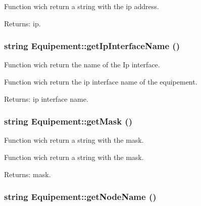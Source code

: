Function wich return a string with the ip address.

\begin{Desc}
\item[Returns:]ip. \end{Desc}
\hypertarget{class_equipement_c1bc0f20388d78e67e4d808548ec0e7e}{
\subsubsection[{getIpInterfaceName}]{\setlength{\rightskip}{0pt plus 5cm}string Equipement::getIpInterfaceName ()}}
\label{class_equipement_c1bc0f20388d78e67e4d808548ec0e7e}


Function wich return the name of the Ip interface. 

Function wich return the ip interface name of the equipement.

\begin{Desc}
\item[Returns:]ip interface name. \end{Desc}
\hypertarget{class_equipement_02fa3326bab78a49535be1cbd2bd8078}{
\subsubsection[{getMask}]{\setlength{\rightskip}{0pt plus 5cm}string Equipement::getMask ()}}
\label{class_equipement_02fa3326bab78a49535be1cbd2bd8078}


Function wich return a string with the mask. 

Function wich return a string with the mask.

\begin{Desc}
\item[Returns:]mask. \end{Desc}
\hypertarget{class_equipement_b8f87002fae848cffc5761f627a5af45}{
\subsubsection[{getNodeName}]{\setlength{\rightskip}{0pt plus 5cm}string Equipement::getNodeName ()}}
\label{class_equipement_b8f87002fae848cffc5761f627a5af45}


